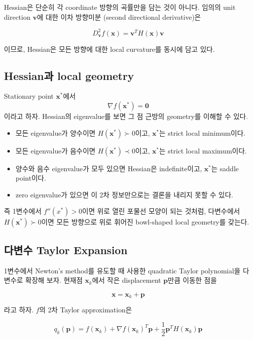 \documentclass[11pt,a4paper]{article}
\begin{document}
Hessian은 단순히 각 coordinate 방향의 곡률만을 담는 것이 아니다.
임의의 unit direction $\mathbf{v}$에 대한 이차 방향미분
(second directional derivative)은

\[
    D_{\mathbf{v}}^2f(\mathbf{x})
    =
    \mathbf{v}^T H(\mathbf{x})\mathbf{v}
\]

이므로, Hessian은 모든 방향에 대한 local curvature를 동시에 담고 있다.

\subsection{Hessian과 local geometry}

Stationary point $\mathbf{x}^*$에서
\[
    \nabla f(\mathbf{x}^*)=\mathbf{0}
\]
이라고 하자. Hessian의 eigenvalue를 보면 그 점 근방의 geometry를 이해할 수 있다.

\begin{itemize}[leftmargin=2em]
    \item 모든 eigenvalue가 양수이면
    $H(\mathbf{x}^*)\succ0$이고, $\mathbf{x}^*$는 strict local minimum이다.

    \item 모든 eigenvalue가 음수이면
    $H(\mathbf{x}^*)\prec0$이고, $\mathbf{x}^*$는 strict local maximum이다.

    \item 양수와 음수 eigenvalue가 모두 있으면 Hessian은 indefinite이고,
    $\mathbf{x}^*$는 saddle point이다.

    \item zero eigenvalue가 있으면 이 2차 정보만으로는 결론을 내리지 못할 수 있다.
\end{itemize}

즉 1변수에서 $f''(x^*)>0$이면 위로 열린 포물선 모양이 되는 것처럼,
다변수에서 $H(\mathbf{x}^*)\succ0$이면 모든 방향으로 위로 휘어진
bowl-shaped local geometry를 갖는다.

\subsection{다변수 Taylor Expansion}

1변수에서 Newton's method를 유도할 때 사용한 quadratic Taylor polynomial을
다변수로 확장해 보자. 현재점 $\mathbf{x}_k$에서 작은 displacement
$\mathbf{p}$만큼 이동한 점을

\[
    \mathbf{x}=\mathbf{x}_k+\mathbf{p}
\]

라고 하자. $f$의 2차 Taylor approximation은

\[
    \boxed{
    q_k(\mathbf{p})
    =
    f(\mathbf{x}_k)
    +
    \nabla f(\mathbf{x}_k)^T\mathbf{p}
    +
    \frac12\mathbf{p}^T
    H(\mathbf{x}_k)\mathbf{p}
    }
\]
\end{document}
